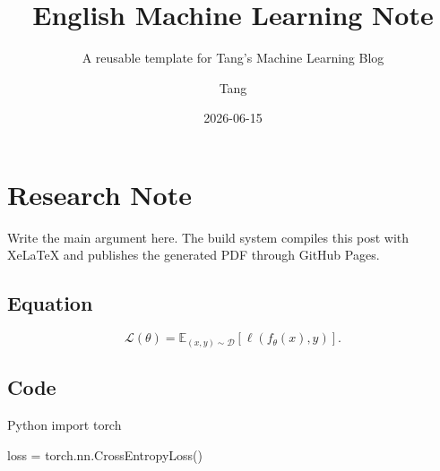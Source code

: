 \documentclass[en,nofont,11pt]{elegantbook}
\title{English Machine Learning Note}
\subtitle{A reusable template for Tang's Machine Learning Blog}
\author{Tang}
\institute{Tang's Machine Learning Blog}
\date{2026-06-15}
\begin{document}
\maketitle
\frontmatter
\tableofcontents
\mainmatter

\chapter{Research Note}

Write the main argument here. The build system compiles this post with XeLaTeX and publishes the generated PDF through GitHub Pages.

\section{Equation}

\[
  \mathcal{L}(\theta)=\mathbb{E}_{(x,y)\sim \mathcal{D}}
  \left[\ell(f_\theta(x), y)\right].
\]

\section{Code}

\begin{codeblock}{Python}
import torch

loss = torch.nn.CrossEntropyLoss()
\end{codeblock}
\end{document}
